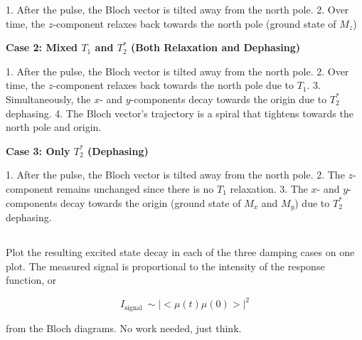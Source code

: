 \documentclass[12pt]{article}
\begin{document}
1. After the pulse, the Bloch vector is tilted away from the north pole.
2. Over time, the \(z\)-component relaxes back towards the north pole (ground state of $M_z$)



\textbf{Case 2: Mixed \(T_1\) and \(T_2^*\) (Both Relaxation and Dephasing)}

1. After the pulse, the Bloch vector is tilted away from the north pole.
2. Over time, the \(z\)-component relaxes back towards the north pole due to \(T_1\).
3. Simultaneously, the \(x\)- and \(y\)-components decay towards the origin due to \(T_2^*\) dephasing.
4. The Bloch vector's trajectory is a spiral that tightens towards the north pole and origin.



\textbf{Case 3: Only \(T_2^*\) (Dephasing)}

1. After the pulse, the Bloch vector is tilted away from the north pole.
2. The \(z\)-component remains unchanged since there is no \(T_1\) relaxation.
3. The \(x\)- and \(y\)-components decay towards the origin (ground state of $M_x$ and $M_y$) due to \(T_2^*\) dephasing.
\subsection{}
Plot the resulting excited state decay in each of the three damping cases on one plot. The measured signal is proportional to the intensity of the response function, or

$$
I_{\text {signal }} \sim|<\mu(t) \mu(0)>|^{2}
$$

from the Bloch diagrams. No work needed, just think.
\end{document}
